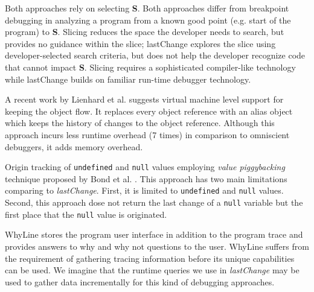 \documentclass{sig-alternate}
\begin{document}
Both approaches rely on selecting {\bf S}. Both approaches differ from breakpoint debugging in analyzing a program from a known good point (e.g. start of the program) to {\bf S}.  Slicing reduces the space the developer needs to search, but provides no guidance within the slice; lastChange explores the slice using developer-selected search criteria, but does not help the developer recognize code that cannot impact {\bf S}. Slicing requires a sophisticated compiler-like technology while lastChange builds on familiar run-time debugger technology. 

A recent work by Lienhard et al.\cite{Lienhard} suggests virtual
machine level support for keeping the object flow. It replaces every
object reference with an alias object which keeps the history of
changes to the object reference. 
Although this approach incurs less runtime overhead (7 times) in
comparison to omniscient debuggers, it adds memory
overhead. 

Origin tracking of \texttt{undefined} and \texttt{null} values employing \textit{value piggybacking} technique proposed by
Bond et al. \cite{Bond}. This approach has two main limitations comparing to \textit{lastChange}.
First, it is limited to \texttt{undefined} and \texttt{null} values. Second, this approach dose not return the last change
of a \texttt{null} variable but the first place that the \texttt{null} value is originated.



WhyLine\cite{Ko} stores the program user interface in
addition to the program trace and provides answers to why and why not
questions to the user. 
WhyLine suffers from the requirement of gathering tracing information before its unique capabilities can be used.
We imagine that the runtime queries we use in \textit{lastChange} may be used to gather data incrementally for this kind of debugging approaches.

 
\end{document}

